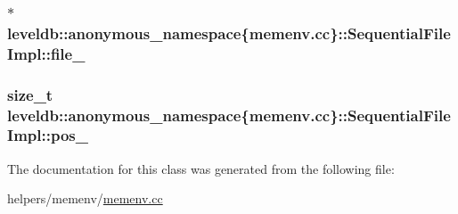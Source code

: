 \subsubsection[{file\+\_\+}]{$\ast$ leveldb\+::anonymous\+\_\+namespace\{memenv.\+cc\}\+::Sequential\+File\+Impl\+::file\+\_\+\hspace{0.3cm}{\ttfamily [private]}}\label{classleveldb_1_1anonymous__namespace_02memenv_8cc_03_1_1_sequential_file_impl_ac642ab422bdaafcc7f75dc14b399fd32}
\hypertarget{classleveldb_1_1anonymous__namespace_02memenv_8cc_03_1_1_sequential_file_impl_aeca2cee028ac90de26788dcf0c0a8ba8}{}
\subsubsection[{pos\+\_\+}]{\setlength{\rightskip}{0pt plus 5cm}size\+\_\+t leveldb\+::anonymous\+\_\+namespace\{memenv.\+cc\}\+::Sequential\+File\+Impl\+::pos\+\_\+\hspace{0.3cm}{\ttfamily [private]}}\label{classleveldb_1_1anonymous__namespace_02memenv_8cc_03_1_1_sequential_file_impl_aeca2cee028ac90de26788dcf0c0a8ba8}


The documentation for this class was generated from the following file\+:\begin{DoxyCompactItemize}
\item 
helpers/memenv/\hyperlink{memenv_8cc}{memenv.\+cc}\end{DoxyCompactItemize}
